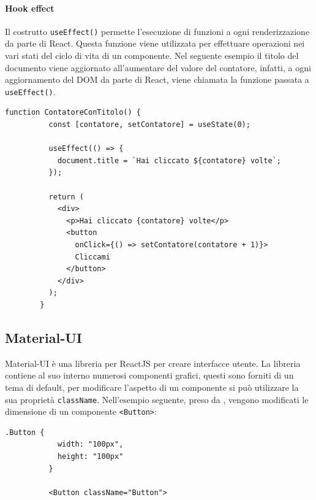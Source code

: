 \documentclass[a4paper]{article}
\begin{document}
      \paragraph{Hook effect}
      Il costrutto \verb|useEffect()| permette l'esecuzione di funzioni a ogni renderizzazione da parte di React.
      Questa funzione viene utilizzata per effettuare operazioni nei vari stati del ciclo di vita di un componente.
      \newline
      Nel seguente esempio il titolo del documento viene aggiornato all'aumentare del valore del contatore, infatti, 
      a ogni aggiornamento del DOM da parte di React, viene chiamata la funzione passata a \verb|useEffect()|.
      \begin{lstlisting}[style=ES6, title={Esempio uso di useEffect()}]
        function ContatoreConTitolo() {
          const [contatore, setContatore] = useState(0);

          useEffect(() => {
            document.title = `Hai cliccato ${contatore} volte`;
          });

          return (
            <div>
              <p>Hai cliccato {contatore} volte</p>
              <button
                onClick={() => setContatore(contatore + 1)}>
                Cliccami
              </button>
            </div>
          );
        }\end{lstlisting}

        \subsection{Material-UI}
        Material-UI è una libreria per ReactJS per creare interfacce utente.
        La libreria contiene al suo interno numerosi componenti grafici,
        questi sono forniti di un tema di default, per modificare l'aspetto di
        un componente si può utilizzare la sua proprietà \verb|className|.
        \newline
        Nell'esempio seguente, preso da \cite{materialui}, vengono modificati le dimensione di un componente \verb|<Button>|:
        \begin{lstlisting}[style=ES6, title={Esempio modifica aspetto di un componente}]
          .Button {
            width: "100px",
            height: "100px"
          }

          <Button className="Button">\end{lstlisting}
\end{document}
